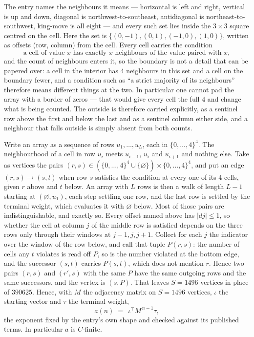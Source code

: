 \documentclass[11pt,a4paper]{article}
\theoremstyle{plain}
\theoremstyle{definition}
\begin{document}
The entry names the neighbours it means --- horizontal is left and right, vertical is up and
down, diagonal is northwest-to-southeast, antidiagonal is northeast-to-southwest, king-move is
all eight --- and every such set lies inside the $3\times3$ square centred on the cell. Here
the set is $\{(0,-1), (0,1), (-1,0), (1,0)\}$, written as offsets (row, column) from the cell. Every cell carries
the condition
\[
\text{a cell of value }x\text{ has exactly }x\text{ neighbours of the value paired with }x,
\]
and the count of neighbours enters it, so the boundary is not a detail that can be papered
over: a cell in the interior has $4$ neighbours in this set and a cell on the boundary
fewer, and a condition such as ``a strict majority of its neighbours'' therefore means
different things at the two. In particular one cannot pad the array with a border of zeros ---
that would give every cell the full $4$ and change what is being counted. The outside is
therefore carried
explicitly, as a sentinel row above the first and below the last and as a sentinel column
either side, and a neighbour that falls outside is simply absent from both counts.

Write an array as a sequence of rows $u_1,\dots,u_L$, each in
$\{0,\dots,4\}^{4}$. The neighbourhood of a cell in row $u_i$ meets $u_{i-1}$,
$u_i$ and $u_{i+1}$ and nothing else. Take as vertices the pairs
$(r,s)\in(\{0,\dots,4\}^{4}\cup\{\varnothing\})\times\{0,\dots,4\}^{4}$,
and put an edge $(r,s)\to(s,t)$ when row $s$ satisfies the condition at every one of its
$4$ cells, given $r$ above and $t$ below. An array with $L$ rows is then a walk of length
$L-1$ starting at $(\varnothing,u_1)$, each step settling one row, and the last row is
settled by the terminal weight, which evaluates it with $\varnothing$ below. Most of those pairs are indistinguishable, and exactly so. Every offset named above has $|dj|\le 1$, so whether the cell at column $j$ of the middle row is satisfied depends on the three rows only through their windows at $j-1,j,j+1$. Collect for each $j$ the indicator over the window of the row below, and call that tuple $P(r,s)$: the number of cells any $t$ violates is read off $P$, so is the number violated at the bottom edge, and the successor $(s,t)$ carries $P(s,t)$, which does not mention $r$. Hence two pairs $(r,s)$ and $(r',s)$ with the same $P$ have the same outgoing rows and the same successors, and the vertex is $(s,P)$. That leaves $S=1496$ vertices in place of $390625$. Hence,
with $M$ the adjacency matrix on $S=1496$ vertices, $\iota$ the starting vector and $\tau$ the
terminal weight,
\[
a(n)\;=\;\,\iota^{\!\top}M^{\,n-1}\tau ,
\]
the exponent fixed by the entry's own shape and checked against its published terms. In
particular $a$ is $C$-finite.
\end{document}

